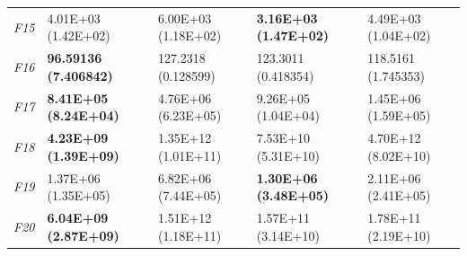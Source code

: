 \begin{table}[!h]
\begin{center}
\begin{tabular}{p{0.5cm}|p{2.5cm}|p{2.5cm}|p{2.5cm}|p{2.5cm}}
\textit{F15}& 4.01E+03 (1.42E+02) & 6.00E+03 (1.18E+02) & \textbf{3.16E+03 (1.47E+02)} & 4.49E+03 (1.04E+02)\\
\textit{F16}& \textbf{96.59136 (7.406842)} & 127.2318 (0.128599) & 123.3011 (0.418354) & 118.5161 (1.745353)\\
\textit{F17}& \textbf{8.41E+05 (8.24E+04)} & 4.76E+06 (6.23E+05) & 9.26E+05 (1.04E+04) & 1.45E+06 (1.59E+05)\\
\textit{F18}& \textbf{4.23E+09 (1.39E+09)} & 1.35E+12 (1.01E+11) & 7.53E+10 (5.31E+10) & 4.70E+12 (8.02E+10)\\
\textit{F19}& 1.37E+06 (1.35E+05) & 6.82E+06 (7.44E+05) & \textbf{1.30E+06 (3.48E+05)} & 2.11E+06 (2.41E+05)\\
 \textit{F20}& \textbf{6.04E+09 (2.87E+09)} & 1.51E+12 (1.18E+11) & 1.57E+11 (3.14E+10) & 1.78E+11 (2.19E+10)\\
\hline
\end{tabular}
\end{center}
\end{table}


